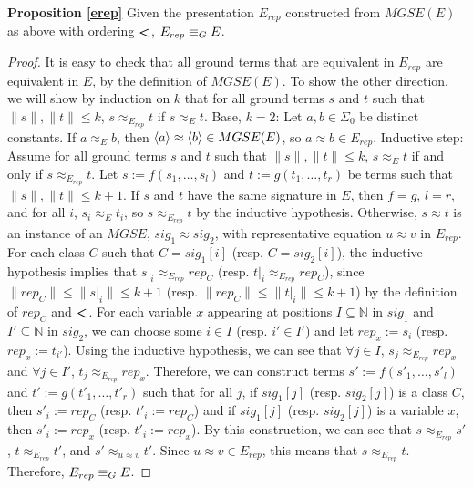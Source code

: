 \noindent \textbf{Proposition \ref{erep}}
Given the presentation $E_{rep}$ constructed from  $MGSE(E)$ as above with ordering $\textbf{\textless}$, $E_{rep} \equiv_G E$.
\begin{proof}
It is easy to check that all ground terms that are equivalent in $E_{rep}$ are equivalent in $E$, by the definition of $MGSE(E)$.
To show the other direction, we will show by induction on $k$ that for all ground terms $s$ and $t$ such that $\|s\|,\|t\| \le k$, $s \approx_{E_{rep}} t$ if  $s \approx_E t$. 
Base, $k=2$: Let $a,b \in \Sigma_0$ be distinct constants. 
If  $a \approx_E b$, then $\langle a \rangle \approx \langle b \rangle \in MGSE(E)$, so $a \approx b \in E_{rep}$.
Inductive step: Assume for all ground terms $s$ and $t$ such that $\|s\|,\|t\| \le k$, $s \approx_E t$ if and only if $s \approx_{E_{rep}} t$. 
Let $s := f(s_1,\dots,s_l)$ and $t := g(t_1,\dots,t_r)$ be terms such that $\|s\|,\|t\| \le k+1$. 
If $s$ and $t$ have the same signature in $E$, then $f = g$, $l = r$, and for all $i$, $s_i \approx_E t_i$, so $s \approx_{E_{rep}} t$ by the inductive hypothesis.
Otherwise, $s\approx t$ is an instance of an $MGSE$, $sig_1 \approx sig_2$, with representative equation $u \approx v$ in $E_{rep}$.
For each class $C$ such that $C = sig_1[i]$ (resp. $C = sig_2[i]$), the inductive hypothesis implies that $s|_i \approx_{E_{rep}} rep_C$ (resp. $t|_i \approx_{E_{rep}} rep_C$), since $\|rep_C\| \le \|s|_i\| \le k+1$ (resp. $\|rep_C\| \le \|t|_i\| \le k+1$) by the definition of $rep_C$ and $\textbf{\textless}$.
For each variable $x$ appearing at positions $I \subseteq \mathbb{N}$ in $sig_1$ and $I' \subseteq \mathbb{N}$ in $sig_2$, we can choose some $i \in I $ (resp. $i' \in I'$) and let $rep_x := s_i$ (resp. $rep_x := t_{i'}$).
Using the inductive hypothesis, we can see that $\forall j \in I$, $s_j \approx_{E_{rep}} rep_x$ and $\forall j \in I'$, $t_j \approx_{E_{rep}} rep_x$.
Therefore, we can construct terms $s' := f(s'_1,\dots,s'_l)$ and $t' := g(t'_1,\dots,t'_r)$ such that for all $j$, if $sig_1[j]$ (resp. $sig_2[j]$) is a class $C$, then $s'_i := rep_C$ (resp. $t'_i := rep_C$) and if $sig_1[j]$ (resp. $sig_2[j]$) is a variable $x$, then $s'_i := rep_x$ (resp. $t'_i := rep_x$).
By this construction, we can see that $s \approx_{E_{rep}} s'$, $t \approx_{E_{rep}} t'$, and $s' \approx_{u \approx v} t'$.
Since $u\approx v \in E_{rep}$, this means that $s \approx_{E_{rep}} t$.
Therefore, $E_{rep} \equiv_G E$. 
\end{proof}


